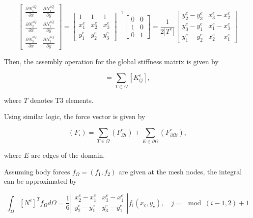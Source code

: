 \documentclass[11pt,fleqn]{article}
\begin{document}
\begin{equation}
\left[
\begin{array}{cc}
\frac{\partial N_1^{4Q}}{\partial x} & \frac{\partial N_1^{4Q}}{\partial y} \\
\frac{\partial N_2^{4Q}}{\partial x} & \frac{\partial N_2^{4Q}}{\partial y} \\
\frac{\partial N_3^{4Q}}{\partial x} & \frac{\partial N_3^{4Q}}{\partial y}
\end{array}
\right]
=
\left[
\begin{array}{ccc}
1 & 1 & 1 \\
x^e_1 & x^e_2 & x^e_3 \\
y^e_1 & y^e_2 & y^e_3
\end{array}
\right]^{-1}
\left[
\begin{array}{cc}
0 & 0 \\
1 & 0 \\
0 & 1
\end{array}
\right]
= \frac{1}{2|T^e|}
\left[
\begin{array}{ccc}
y_2^e-y_3^e & x_3^e-x_2^e \\
y_3^e-y_1^e & x_1^e-x_3^e \\
y_1^e-y_2^e & x_2^e-x_1^e
\end{array}
\right]
\end{equation}

Then, the assembly operation for the global stiffness matrix is given by

\begin{equation}
	[K_{ij}] = \sum_{T \in \Omega} [K^e_{ij}],
\end{equation}

where $T$ denotes T3 elements. 

Using similar logic, the force vector is given by

\begin{equation}
	(F_i) = \sum_{T \in \Omega} (F_{\Omega i}^e) + \sum_{E \in \partial\Omega} (F_{\partial \Omega i}^e),
\end{equation}

where $E$ are edges of the domain. 

Assuming body forces $f_{\Omega} = (f_1, f_2)$ are given at the mesh nodes, the integral can be approximated by 

\begin{equation}
\int_\Omega [N^e]^T f_{\Omega} d\Omega = \frac{1}{6} 
\left|
\begin{array}{ccc}
x_2^e - x_1^e & x_3^e - x_1^e \\
y_2^e - y_1^e & y_3^e - y_1^e
\end{array}
\right|
f_i(x_c,y_c), \quad j=\mod(i-1,2)+1
\end{equation}
\end{document}

